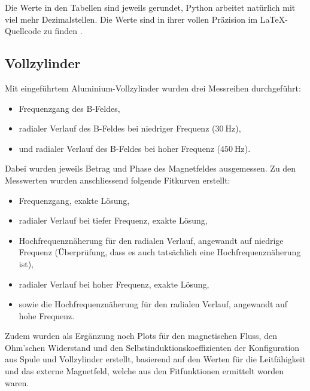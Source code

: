 Die Werte in  den Tabellen sind jeweils gerundet,  Python arbeitet nat\"urlich
mit viel  mehr Dezimalstellen. Die Werte  sind in ihrer vollen  Pr\"azision im
\LaTeX-Quellcode zu finden \cite{ref:aw:github}.


\subsection{Vollzylinder}
\label{sec:ausw:subsec:hohlz}

Mit   eingef\"uhrtem   Aluminium-Vollzylinder   wurden   drei   Messreihen
durchgef\"uhrt:
\begin{itemize}
    \item
        Frequenzgang des B-Feldes,
    \item
        radialer    Verlauf    des    B-Feldes    bei    niedriger    Frequenz
        ($\SI{30}{\hertz}$),
    \item
        und    radialer   Verlauf    des   B-Feldes    bei   hoher    Frequenz
        ($\SI{450}{\hertz}$).
\end{itemize}

Dabei wurden  jeweils Betrag  und Phase  des Magnetfeldes  ausgemessen. Zu den
Messwerten wurden anschliessend folgende Fitkurven erstellt:
\begin{itemize}
    \item
        Frequenzgang, exakte L\"osung,
    \item
        radialer Verlauf bei tiefer Frequenz, exakte L\"osung,
    \item
        Hochfrequenzn\"aherung  f\"ur  den  radialen  Verlauf,  angewandt  auf
        niedrige Frequenz  (\"Uberpr\"ufung, dass  es auch  tats\"achlich eine
        Hochfrequenzn\"aherung ist),
    \item
        radialer Verlauf bei hoher Frequenz, exakte L\"osung,
    \item
        sowie die Hochfrequenzn\"aherung f\"ur den radialen Verlauf, angewandt
        auf hohe Frequenz.
\end{itemize}

Zudem  wurden als  Erg\"anzung noch  Plots f\"ur  den magnetischen  Fluss, den
Ohm'schen Widerstand  und den Selbstinduktionskoeffizienten  der Konfiguration
aus  Spule und  Vollzylinder  erstellt,  basierend auf  den  Werten f\"ur  die
Leitf\"ahigkeit  und  das externe  Magnetfeld,  welche  aus den  Fitfunktionen
ermittelt worden waren.

